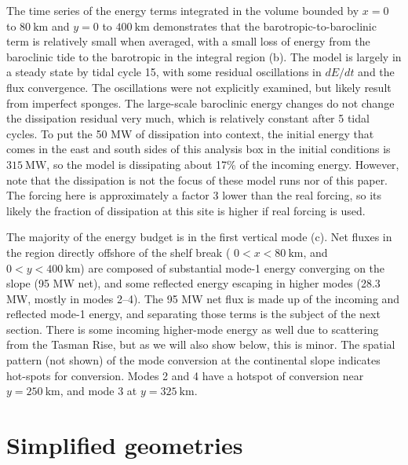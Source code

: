 \documentclass[12pt]{article}
\begin{document}
The time series of the energy terms integrated in the volume bounded by $x=0$ to $80\  \mathrm{km}$ and $y = 0$ to $400\ \mathrm{km}$ demonstrates that the barotropic-to-baroclinic term is relatively small when averaged, with a small loss of energy from the baroclinic tide to the barotropic in the integral region (b).  The model is largely in a steady state by tidal cycle 15, with some residual oscillations in $dE/dt$ and the flux convergence.  The oscillations were not explicitly examined, but likely result from imperfect sponges. The large-scale baroclinic energy changes do not change the dissipation residual very much, which is relatively constant after 5 tidal cycles.  To put the 50 MW of dissipation into context, the initial energy that comes in the east and south sides of this analysis box in the initial conditions is $315\ \mathrm{MW}$, so the model is dissipating about 17\% of the incoming energy.  However, note that the dissipation is not the focus of these model runs nor of this paper. The forcing here is approximately a factor 3 lower than the real forcing, so its likely the fraction of dissipation at this site is higher if real forcing is used.  

The majority of the energy budget is in the first vertical mode (c).  Net fluxes in the region directly offshore of the shelf break ( $0<x<80\ \mathrm{km}$, and $0<y<400\ \mathrm{km}$) are composed of substantial mode-1 energy converging on the slope (95 MW net), and some reflected energy escaping in higher modes (28.3 MW, mostly in modes 2--4).  The 95 MW net flux is made up of the incoming and reflected mode-1 energy, and separating those terms is the subject of the next section.  There is some incoming higher-mode energy as well due to scattering from the Tasman Rise, but as we will also show below, this is minor.  The spatial pattern (not shown) of the mode conversion at the continental slope indicates hot-spots for conversion.  Modes 2 and 4 have a hotspot of conversion near $y=250\ \mathrm{km}$, and mode 3 at $y=325\ \mathrm{km}$.  

\section{Simplified geometries}
\label{sec:Simplified}
\end{document}
